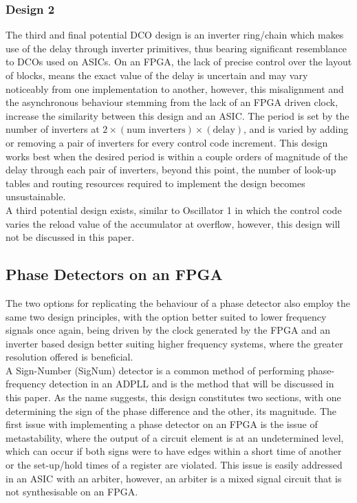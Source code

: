 \documentclass[conference]{IEEEtran}
\begin{document}
{\subsubsection*{Design 2}
The third and final potential DCO design is an inverter ring/chain which makes use of the delay through inverter primitives, thus bearing significant resemblance to DCOs used on ASICs. On an FPGA, the lack of precise control over the layout of blocks, means the exact value of the delay is uncertain and may vary noticeably from one implementation to another, however, this misalignment and the asynchronous behaviour stemming from the lack of an FPGA driven clock, increase the similarity between this design and an ASIC. The period is set by the number of inverters at $2\times(\textrm{num inverters})\times(\textrm{delay})$, and is varied by adding or removing a pair of inverters for every control code increment. This design works best when the desired period is within a couple orders of magnitude of the delay through each pair of inverters, beyond this point, the number of look-up tables and routing resources required to implement the design becomes unsustainable.\\

A third potential design exists, similar to Oscillator 1 in which the control code varies the reload value of the accumulator at overflow, however, this design will not be discussed in this paper.

\subsection{Phase Detectors on an FPGA}
The two options for replicating the behaviour of a phase detector also employ the same two design principles, with the option better suited to lower frequency signals once again, being driven by the clock generated by the FPGA and an inverter based design better suiting higher frequency systems, where the greater resolution offered is beneficial.\\
A  Sign-Number (SigNum) detector is a common method of performing phase-frequency detection in an ADPLL and is the method that will be discussed in this paper. As the name suggests, this design constitutes two sections, with one determining the sign of the phase difference and the other, its magnitude. The first issue with implementing a phase detector on an FPGA is the issue of metastability, where the output of a circuit element is at an undetermined level, which can occur if both signs were to have edges within a short time of another or the set-up/hold times of a register are violated. This issue is easily addressed in an ASIC with an arbiter, however, an arbiter is a mixed signal circuit that is not synthesisable on an FPGA.

}
\end{document}
